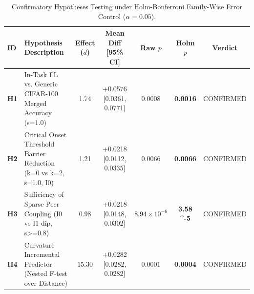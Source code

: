 \begin{table}[t]
\centering
\small
\caption{Confirmatory Hypotheses Testing under Holm-Bonferroni Family-Wise Error Control ($\alpha=0.05$).}
\label{tab:hypotheses_certification}
\begin{tabular}{llccccc}
\toprule
\textbf{ID} & \textbf{Hypothesis Description} & \textbf{Effect ($d$)} & \textbf{Mean Diff [95\% CI]} & \textbf{Raw $p$} & \textbf{Holm $p$} & \textbf{Verdict} \\
\midrule
\textbf{H1} & In-Task FL vs. Generic CIFAR-100 Merged Accuracy (s=1.0) & 1.74 & +0.0576 [0.0361, 0.0771] & $0.0008$ & \textbf{0.0016} & \textsc{CONFIRMED} \\
\textbf{H2} & Critical Onset Threshold Barrier Reduction (k=0 vs k=2, s=1.0, I0) & 1.21 & +0.0218 [0.0112, 0.0335] & $0.0066$ & \textbf{0.0066} & \textsc{CONFIRMED} \\
\textbf{H3} & Sufficiency of Sparse Peer Coupling (I0 vs I1 dip, s>=0.8) & 0.98 & +0.0218 [0.0148, 0.0302] & $8.94 \times 10^{-6}$ & \textbf{3.58 \times 10^{-5}} & \textsc{CONFIRMED} \\
\textbf{H4} & Curvature Incremental Predictor (Nested F-test over Distance) & 15.30 & +0.0282 [0.0282, 0.0282] & $0.0001$ & \textbf{0.0004} & \textsc{CONFIRMED} \\
\bottomrule
\end{tabular}
\end{table}
